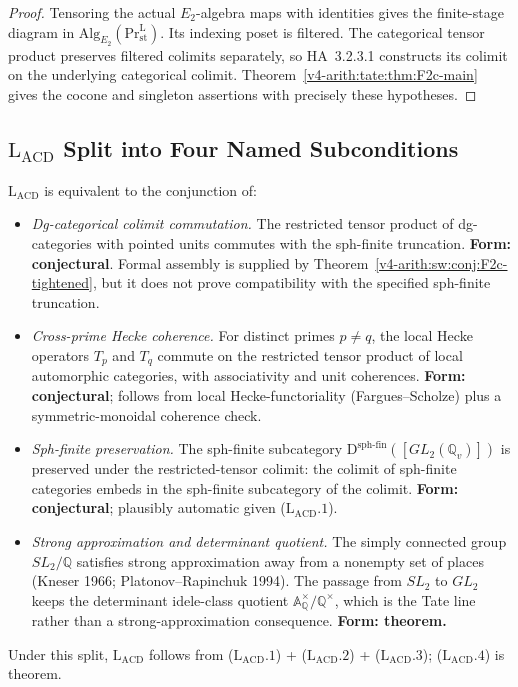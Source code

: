 \begin{proof}
Tensoring the actual \(E_2\)-algebra maps with identities gives
the finite-stage diagram in
\(\mathrm{Alg}_{E_2}(\mathrm{Pr}^{\mathrm L}_{\mathrm{st}})\).
Its indexing poset is filtered. The categorical tensor product
preserves filtered colimits separately, so HA~3.2.3.1 constructs
its colimit on the underlying categorical colimit.
Theorem~\ref{v4-arith:tate:thm:F2c-main} gives the cocone and
singleton assertions with precisely these hypotheses.
\end{proof}

\subsection{\texorpdfstring{\(\mathrm{L}_{\mathrm{ACD}}\)}{L-ACD} Split into Four Named Subconditions}

\begin{theorem}
\label{v4-arith:sw:thm:LACD-split}
\(\mathrm{L}_{\mathrm{ACD}}\) is equivalent to
the conjunction of:
\begin{itemize}
\item[(\(\mathrm{L}_{\mathrm{ACD}}.1\))] \emph{Dg-categorical colimit
commutation.} The restricted tensor product of dg-categories
with pointed units commutes with the sph-finite truncation.
\textbf{Form: conjectural}. Formal assembly is supplied by
Theorem~\ref{v4-arith:sw:conj:F2c-tightened}, but it does not prove
compatibility with the specified sph-finite truncation.
\item[(\(\mathrm{L}_{\mathrm{ACD}}.2\))] \emph{Cross-prime Hecke
coherence.} For distinct primes \(p\neq q\), the local Hecke
operators \(T_{p}\) and \(T_{q}\) commute on the restricted tensor
product of local automorphic categories, with associativity and
unit coherences.
\textbf{Form: conjectural}; follows from local Hecke-functoriality
(Fargues--Scholze) plus a symmetric-monoidal coherence check.
\item[(\(\mathrm{L}_{\mathrm{ACD}}.3\))] \emph{Sph-finite preservation.}
The sph-finite subcategory
\(\mathrm{D}^{\mathrm{sph\text{-}fin}}([GL_{2}(\mathbb{Q}_{v})])\) is
preserved under the restricted-tensor colimit: the colimit of
sph-finite categories embeds in the sph-finite subcategory of the
colimit.
\textbf{Form: conjectural}; plausibly automatic given
(\(\mathrm{L}_{\mathrm{ACD}}.1\)).
\item[(\(\mathrm{L}_{\mathrm{ACD}}.4\))] \emph{Strong approximation and determinant quotient.}
The simply connected group \(SL_{2}/\mathbb{Q}\) satisfies strong
approximation away from a nonempty set of places (Kneser 1966;
Platonov--Rapinchuk 1994). The passage from \(SL_{2}\) to \(GL_{2}\)
keeps the determinant idele-class quotient
\(\mathbb{A}_{\mathbb{Q}}^{\times}/\mathbb{Q}^{\times}\), which is
the Tate line rather than a strong-approximation consequence.
\textbf{Form: theorem.}
\end{itemize}
Under this split, \(\mathrm{L}_{\mathrm{ACD}}\) follows from
(\(\mathrm{L}_{\mathrm{ACD}}.1\)) + (\(\mathrm{L}_{\mathrm{ACD}}.2\)) +
(\(\mathrm{L}_{\mathrm{ACD}}.3\)); (\(\mathrm{L}_{\mathrm{ACD}}.4\))
is theorem.
\end{theorem}

